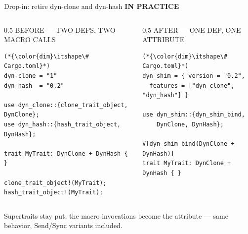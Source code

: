 \documentclass[aspectratio=169,11pt,t]{beamer}
\newcommand{\code}[1]{{\ttfamily\small\color{oxidesoft}#1}}
\newcommand{\eyebrow}[2][steel]{{\ttfamily\scriptsize\bfseries\color{#1}\MakeUppercase{#2}}\par\vspace{0.4em}}
\newcommand{\panelhd}[1]{{\ttfamily\scriptsize\color{dim}\MakeUppercase{#1}}\\[3pt]}
\newcommand{\lede}[1]{{\color{muted}\fontsize{13}{18.5}\selectfont #1\par}}
\begin{document}
\begin{frame}[fragile]{Drop-in: retire \code{dyn-clone} and \code{dyn-hash}}
\eyebrow[oxide]{In practice}
\begin{columns}[T]
\begin{column}{0.5\textwidth}
\panelhd{before --- two deps, two macro calls}
\begin{lstlisting}
(*{\color{dim}\itshape\# Cargo.toml}*)
dyn-clone = "1"
dyn-hash  = "0.2"

use dyn_clone::{clone_trait_object, DynClone};
use dyn_hash::{hash_trait_object, DynHash};

trait MyTrait: DynClone + DynHash { }

clone_trait_object!(MyTrait);
hash_trait_object!(MyTrait);
\end{lstlisting}
\end{column}
\begin{column}{0.5\textwidth}
\panelhd{after --- one dep, one attribute}
\begin{lstlisting}
(*{\color{dim}\itshape\# Cargo.toml}*)
dyn_shim = { version = "0.2",
  features = ["dyn_clone", "dyn_hash"] }

use dyn_shim::{dyn_shim_bind,
    DynClone, DynHash};

#[dyn_shim_bind(DynClone + DynHash)]
trait MyTrait: DynClone + DynHash { }
\end{lstlisting}
\end{column}
\end{columns}
\vspace{0.3em}
\lede{Supertraits stay put; the macro invocations become the attribute --- same behavior, \code{Send}/\code{Sync} variants included.}
\end{frame}
\end{document}
